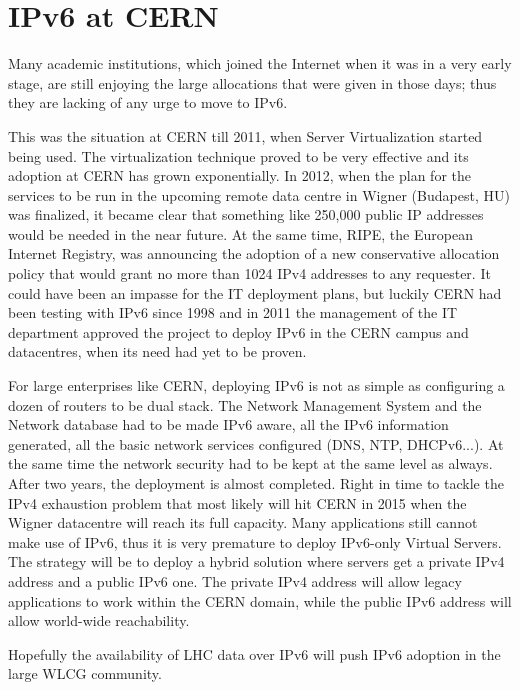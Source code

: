 \section{IPv6 at CERN}
Many academic institutions, which joined the Internet when it was in a very early stage, are still enjoying the large allocations that were given in those days; thus they are lacking of any urge to move to IPv6.
\par 
This was the situation at CERN till 2011, when Server Virtualization started being used. The virtualization technique proved to be very effective and its adoption at CERN has grown exponentially. In 2012, when the plan for the services to be run in the upcoming remote data centre in Wigner (Budapest, HU) was finalized, it became clear that something like 250,000 public IP addresses would be needed in the near future. At the same time, RIPE, the European Internet Registry, was announcing the adoption of a new conservative allocation policy that would grant no more than 1024 IPv4 addresses to any requester. 
It could have been an impasse for the IT deployment plans, but luckily CERN had been testing with IPv6 since 1998 and in 2011 the management of the IT department approved the project to deploy IPv6 in the CERN campus and datacentres, when its need had yet to be proven.
\par
For large enterprises like CERN, deploying IPv6 is not as simple as configuring a dozen of routers to be dual stack. The Network Management System and the Network database had to be made IPv6 aware, all the IPv6 information generated, all the basic network services configured (DNS, NTP, DHCPv6...). At the same time the network security had to be kept at the same level as always.
After two years, the deployment is almost completed. Right in time to tackle the IPv4 exhaustion problem that most likely will hit CERN in 2015 when the Wigner datacentre will reach its full capacity. 
Many applications still cannot make use of IPv6, thus it is very premature to deploy IPv6-only Virtual Servers. The strategy will be to deploy a hybrid solution where servers get a private IPv4 address and a public IPv6 one. The private IPv4 address will allow legacy applications to work within the CERN domain,  while the public IPv6 address will allow world-wide reachability.
\par
Hopefully the availability of LHC data over IPv6 will push IPv6 adoption in the large WLCG community.
